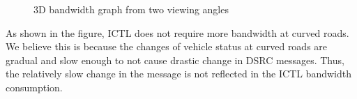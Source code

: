 \documentclass[12pt]{report}
\begin{document}
\begin{figure}[h]
  \caption{\label{fig:3d}3D bandwidth graph from two viewing angles}
\end{figure}

As shown in the figure, ICTL does not require more bandwidth at curved roads. We believe this is because the changes of vehicle status at curved roads are gradual and slow enough to not cause drastic change in DSRC messages. Thus, the relatively slow change in the message is not reflected in the ICTL bandwidth consumption.
\end{document}
